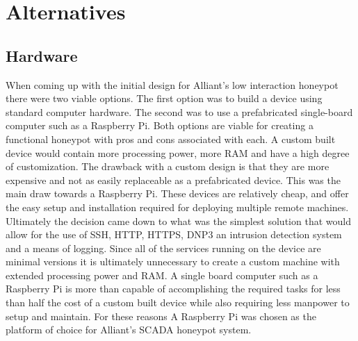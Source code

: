\chapter{Alternatives}

\section{Hardware}
When coming up with the initial design for Alliant's low interaction honeypot there were two viable options. The first option was to build a device using standard computer hardware. The second was to use a prefabricated single-board computer such as a Raspberry Pi. Both options are viable for creating a functional honeypot with pros and cons associated with each. A custom built device would contain more processing power, more RAM and have a high degree of customization. The drawback with a custom design is that they are more expensive and not as easily replaceable as a prefabricated device. This was the main draw towards a Raspberry Pi. These devices are relatively cheap, and offer the easy setup and installation required for deploying multiple remote machines. Ultimately the decision came down to what was the simplest solution that would allow for the use of SSH, HTTP, HTTPS, DNP3 an intrusion detection system and a means of logging. Since all of the services running  on the device are minimal versions it is ultimately unnecessary to create a custom machine with extended processing power and RAM. A single board computer such as a Raspberry Pi is more than capable of accomplishing the required tasks for less than half the cost of a custom built device while also requiring less manpower to setup and maintain. For these reasons A Raspberry Pi was chosen as the platform of choice for Alliant's SCADA honeypot system.
